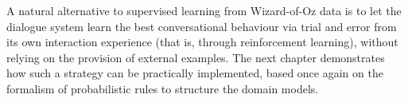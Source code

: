 A natural alternative to supervised learning from Wizard-of-Oz data is to let the dialogue system learn the best conversational behaviour via trial and error from its own interaction experience (that is, through reinforcement learning), without relying on the provision of external examples.  The next chapter demonstrates how such a strategy can be practically implemented, based once again on the formalism of probabilistic rules to structure the domain models. 
